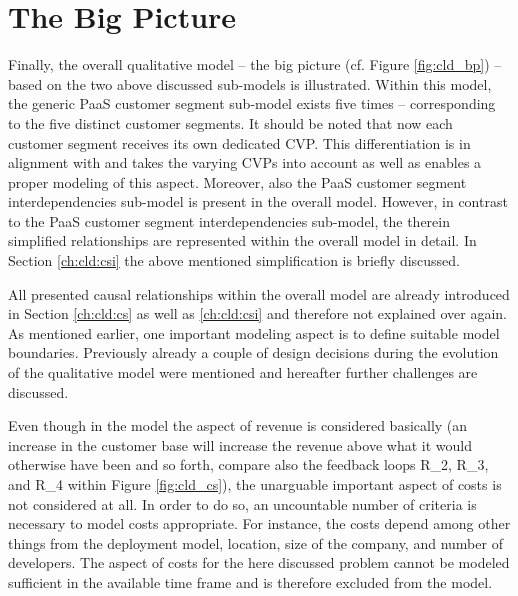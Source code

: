 \section{The Big Picture}\label{ch:cld:bp}

Finally, the overall qualitative model -- the big picture (cf. Figure \ref{fig:cld_bp}) -- based on the two above discussed sub-models is illustrated. Within this model, the generic \ac{PaaS} customer segment sub-model exists five times -- corresponding to the five distinct customer segments. It should be noted that now each customer segment receives its own dedicated \ac{CVP}. This differentiation is in alignment with \citet{Johnson2008} and takes the varying \acp{CVP} into account as well as enables a proper modeling of this aspect. Moreover, also the \ac{PaaS} customer segment interdependencies sub-model is present in the overall model. However, in contrast to the \ac{PaaS} customer segment interdependencies sub-model, the therein simplified relationships are represented within the overall model in detail. In Section \ref{ch:cld:csi} the above mentioned simplification is briefly discussed.

All presented causal relationships within the overall model are already introduced in Section \ref{ch:cld:cs} as well as \ref{ch:cld:csi} and therefore not explained over again. As mentioned earlier, one important modeling aspect is to define suitable model boundaries. Previously already a couple of design decisions during the evolution of the qualitative model were mentioned and hereafter further challenges are discussed.

Even though in the model the aspect of revenue is considered basically (an increase in the customer base will increase the revenue above what it would otherwise have been and so forth, compare also the feedback loops R\_2, R\_3, and R\_4 within Figure \ref{fig:cld_cs}), the unarguable important aspect of costs is not considered at all. In order to do so, an uncountable number of criteria is necessary to model costs appropriate. For instance, the costs depend among other things from the deployment model, location, size of the company, and number of developers. The aspect of costs for the here discussed problem cannot be modeled sufficient in the available time frame and is therefore excluded from the model.

